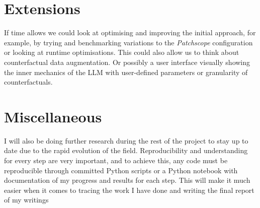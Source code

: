 \section{Extensions}
If time allows we could look at optimising and improving the initial approach, for example, by trying and benchmarking variations to the \textit{Patchscope} configuration or looking at runtime optimisations. This could also allow us to think about counterfactual data augmentation. Or possibly a user interface visually showing the inner mechanics of the LLM with user-defined parameters or granularity of counterfactuals.

\section{Miscellaneous}
I will also be doing further research during the rest of the project to stay up to date due to the rapid evolution of the field. Reproducibility and understanding for every step are very important, and to achieve this, any code must be reproducible through committed Python scripts or a Python notebook with documentation of my progress and results for each step. This will make it much easier when it comes to tracing the work I have done and writing the final report of my writings

